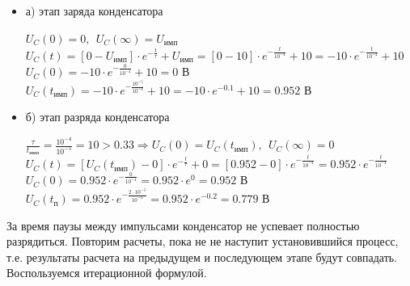 \documentclass[a4paper,14pt]{extarticle}
\begin{document}
\begin{itemize}
\item[] а) этап заряда конденсатора

	$U_C(0) = 0,\ \ U_C(\infty) = U_\text{имп}$\\	
	$U_C(t) = [0 - U_\text{имп}] \cdot e^{-\frac{t}{\tau}} + U_\text{имп} = [0 - 10] \cdot e^{-\frac{t}{10^{-4}}} + 10 = -10 \cdot e^{-\frac{t}{10^{-4}}} + 10$\\
	$U_C(0) = -10 \cdot e^{-\frac{0}{10^{-4}}} + 10 = 0 \text{ В}$\\
	$U_C(t_\text{имп}) = -10 \cdot e^{-\frac{10^{-5}}{10^{-4}}} + 10 = -10 \cdot e^{-0.1} + 10 = 0.952 \text{ В}$
	
\item[] б) этап разряда конденсатора

	$\frac{\tau}{t_\text{имп}} = \frac{10^{-4}}{10^{-5}} = 10 > 0.33 \Rightarrow U_C(0) = U_C(t_\text{имп}),\ \ U_C(\infty) = 0$\\
	$U_C(t) = [U_C(t_\text{имп}) - 0] \cdot e^{-\frac{t}{\tau}} + 0 =  [0.952 - 0] \cdot e^{-\frac{t}{10^{-4}}} = 0.952 \cdot e^{-\frac{t}{10^{-4}}}$\\
	$U_C(0) = 0.952 \cdot e^{-\frac{0}{10^{-4}}} = 0.952 \cdot e^0 = 0.952 \text{ В}$\\
	$U_C(t_\text{п}) = 0.952 \cdot e^{-\frac{ 2 \cdot 10^{-5}}{10^{-4}}} = 0.952 \cdot e^{-0.2} = 0.779 \text{ В}$
\end{itemize}				
		
За время паузы между импульсами конденсатор не успевает полностью разрядиться. Повторим расчеты, пока не не наступит установившийся процесс, т.е. результаты расчета на предыдущем и последующем этапе будут совпадать.	Воспользуемся итерационной формулой.
\end{document}
